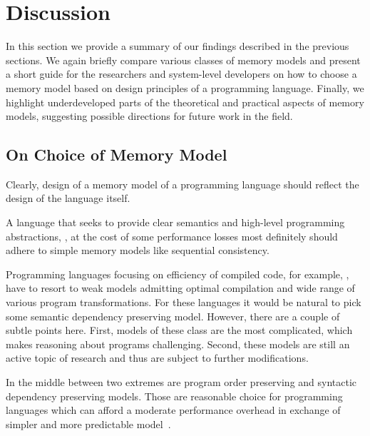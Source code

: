 \section{Discussion}
\label{sec:discussion}

In this section we provide a summary of our findings described in the previous sections. 
We again briefly compare various classes of memory models 
and present a short guide for the researchers and system-level developers 
on how to choose a memory model based on 
design principles of a programming language.   
Finally, we highlight underdeveloped parts of the theoretical
and practical aspects of memory models, suggesting 
possible directions for future work in the field. 

\subsection{On Choice of  Memory Model}

Clearly, design of a memory model of a programming language
should reflect the design of the language itself. 

A language that seeks to provide clear semantics and 
high-level programming abstractions, \eg \Haskell, at the cost 
of some performance losses most definitely should 
adhere to simple memory models like sequential consistency. 

Programming languages focusing on efficiency 
of compiled code, for example, \CPP, 
have to resort to weak models admitting 
optimal compilation and wide range of 
various program transformations. 
For these languages it would be natural 
to pick some semantic dependency preserving model. 
However, there are a couple of subtle points here. 
First, models of these class are the most complicated, 
which makes reasoning about programs challenging. 
Second, these models are still an active topic 
of research and thus are subject to further modifications.

In the middle between two extremes are program order preserving and 
syntactic dependency preserving models.
Those are reasonable choice for programming languages
which can afford a moderate performance overhead 
in exchange of simpler and more predictable model~\cite{Ou-Demsky:OOPSLA18}.

